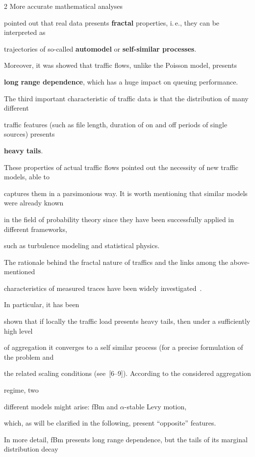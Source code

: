 \begin{multicols}{2}
More accurate mathematical analyses~\cite{1-nik} 

pointed out that real data presents {\bf fractal} properties, i.\,e., they can be interpreted as 

trajectories of so-called {\bf automodel} or {\bf self-similar processes}.

Moreover, it was showed that traffic flows, unlike the Poisson model, presents 

{\bf long range dependence}, which has a huge impact on queuing performance.

The third important characteristic of traffic data is that the distribution of many different 

traffic features (such as file length, duration of on and off periods of single sources) presents 

{\bf heavy tails}. 



These  properties of actual traffic flows pointed out the necessity of new traffic models, able to 

captures them in a parsimonious way. It is worth mentioning that similar models were already known 

in the field of probability theory since they have been successfully applied in different frameworks, 

such as turbulence modeling and statistical physics.  



The rationale behind the fractal nature of traffics and the links among the above-mentioned 

characteristics of measured traces have been widely investigated~\cite{5-nik}. 

In particular, it has been 

shown that if locally the traffic load presents heavy tails, then under a sufficiently high level 

of aggregation it converges to a self similar process (for a precise formulation of the problem and 

the related scaling conditions (see~[6--9]). According to the considered aggregation 

regime, two 

different models might arise: fBm and $\alpha$-stable Levy motion, 

which, as will be clarified in the following, present ``opposite'' features.  

In more detail, fBm presents long range dependence, but the tails of its marginal distribution decay 


\end{multicols}
